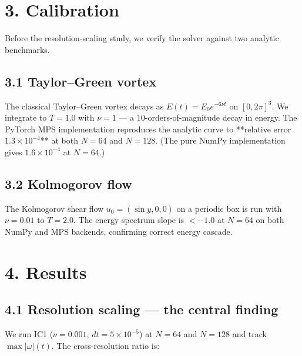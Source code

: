 \documentclass[11pt]{article}
\begin{document}
\section{3. Calibration}

Before the resolution-scaling study, we verify the solver against two
analytic benchmarks.


\subsection*{3.1 Taylor–Green vortex}

The classical Taylor–Green vortex decays as
\(E(t) = E_0 e^{-6\nu t}\) on \([0, 2\pi]^3\). We integrate to \(T = 1.0\) with
\(\nu = 1\) — a 10-orders-of-magnitude decay in energy. The PyTorch MPS
implementation reproduces the analytic curve to **relative error
\(1.3 \times 10^{-4}\)** at both \(N = 64\) and \(N = 128\). (The pure NumPy
implementation gives \(1.6 \times 10^{-4}\) at \(N = 64\).)


\subsection*{3.2 Kolmogorov flow}

The Kolmogorov shear flow \(u_0 = (\sin y, 0, 0)\) on a periodic box is
run with \(\nu = 0.01\) to \(T = 2.0\). The energy spectrum slope is \(< -1.0\)
at \(N = 64\) on both NumPy and MPS backends, confirming correct energy
cascade.


\section{4. Results}


\subsection*{4.1 Resolution scaling — the central finding}

We run IC1 (\(\nu = 0.001\), \(dt = 5 \times 10^{-5}\)) at \(N = 64\) and \(N = 128\)
and track \(\max|\omega|(t)\). The cross-resolution ratio is:
\end{document}
